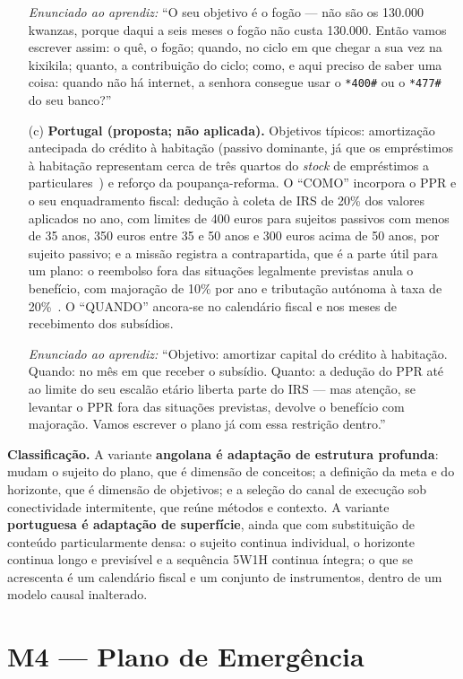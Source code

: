 \begin{enumerate}
\noindent\textit{Enunciado ao aprendiz:} ``O seu objetivo é o fogão --- não são os 130.000 kwanzas, porque daqui a seis meses o fogão não custa 130.000. Então vamos escrever assim: o quê, o fogão; quando, no ciclo em que chegar a sua vez na kixikila; quanto, a contribuição do ciclo; como, e aqui preciso de saber uma coisa: quando não há internet, a senhora consegue usar o \texttt{*400\#} ou o \texttt{*477\#} do seu banco?''

\item[(c)] \textbf{Portugal (proposta; não aplicada).} Objetivos típicos: amortização antecipada do crédito à habitação (passivo dominante, já que os empréstimos à habitação representam cerca de três quartos do \textit{stock} de empréstimos a particulares~\cite{leitao2025}) e reforço da poupança-reforma. O ``COMO'' incorpora o PPR e o seu enquadramento fiscal: dedução à coleta de IRS de 20\% dos valores aplicados no ano, com limites de 400 euros para sujeitos passivos com menos de 35 anos, 350 euros entre 35 e 50 anos e 300 euros acima de 50 anos, por sujeito passivo; e a missão registra a contrapartida, que é a parte útil para um plano: o reembolso fora das situações legalmente previstas anula o benefício, com majoração de 10\% por ano e tributação autónoma à taxa de 20\%~\cite{ebf21}. O ``QUANDO'' ancora-se no calendário fiscal e nos meses de recebimento dos subsídios.

\noindent\textit{Enunciado ao aprendiz:} ``Objetivo: amortizar capital do crédito à habitação. Quando: no mês em que receber o subsídio. Quanto: a dedução do PPR até ao limite do seu escalão etário liberta parte do IRS --- mas atenção, se levantar o PPR fora das situações previstas, devolve o benefício com majoração. Vamos escrever o plano já com essa restrição dentro.''
\end{enumerate}

\noindent\textbf{Classificação.} A variante \textbf{angolana é adaptação de estrutura profunda}: mudam o sujeito do plano, que é dimensão de conceitos; a definição da meta e do horizonte, que é dimensão de objetivos; e a seleção do canal de execução sob conectividade intermitente, que reúne métodos e contexto. A variante \textbf{portuguesa é adaptação de superfície}, ainda que com substituição de conteúdo particularmente densa: o sujeito continua individual, o horizonte continua longo e previsível e a sequência 5W1H continua íntegra; o que se acrescenta é um calendário fiscal e um conjunto de instrumentos, dentro de um modelo causal inalterado.

\section*{M4 --- Plano de Emergência}

